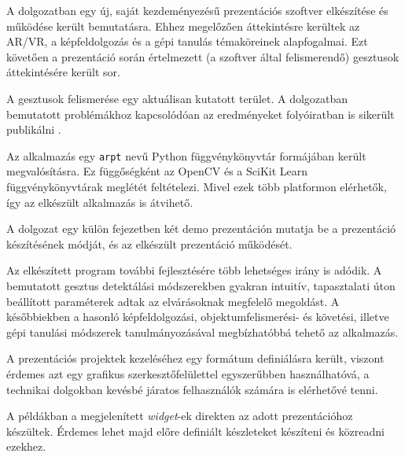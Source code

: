 
A dolgozatban egy új, saját kezdeményezésű prezentációs szoftver elkészítése és működése került bemutatásra.
Ehhez megelőzően áttekintésre kerültek az AR/VR, a képfeldolgozás és a gépi tanulás témaköreinek alapfogalmai.
Ezt követően a prezentáció során értelmezett (a szoftver által felismerendő) gesztusok áttekintésére került sor.

A gesztusok felismerése egy aktuálisan kutatott terület. A dolgozatban bemutatott problémákhoz kapcsolódóan az eredményeket folyóiratban is sikerült publikálni \cite{nagy2020gesture}.

Az alkalmazás egy \texttt{arpt} nevű Python függvénykönyvtár formájában került megvalósításra. Ez függőségként az OpenCV és a SciKit Learn függvénykönyvtárak meglétét feltételezi. Mivel ezek több platformon elérhetők, így az elkészült alkalmazás is átvihető.

A dolgozat egy külön fejezetben két demo prezentáción mutatja be a prezentáció készítésének módját, és az elkészült prezentáció működését.

Az elkészített program további fejlesztésére több lehetséges irány is adódik.
A bemutatott gesztus detektálási módszerekben gyakran intuitív, tapasztalati úton beállított paraméterek adtak az elvárásoknak megfelelő megoldást.
A későbbiekben a hasonló képfeldolgozási, objektumfelismerési- és követési, illetve gépi tanulási módszerek tanulmányozásával megbízhatóbbá tehető az alkalmazás.

A prezentációs projektek kezeléséhez egy formátum definiálásra került, viszont érdemes azt egy grafikus szerkesztőfelülettel egyszerűbben használhatóvá, a technikai dolgokban kevésbé járatos felhasználók számára is elérhetővé tenni.

A példákban a megjelenített \textit{widget}-ek direkten az adott prezentációhoz készültek. Érdemes lehet majd előre definiált készleteket készíteni és közreadni ezekhez.
